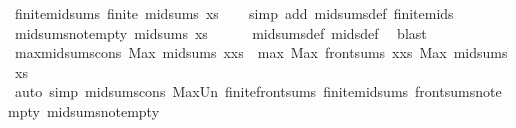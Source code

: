 \begin{isabellebody}
{\isafoldproof}%
%
\isadelimproof
\isanewline
%
\endisadelimproof
\isanewline
{}\isamarkupfalse%
\ finite{\isacharunderscore}{\kern0pt}mid{\isacharunderscore}{\kern0pt}sums{\isacharcolon}{\kern0pt}\ {\isachardoublequoteopen}finite\ {\isacharparenleft}{\kern0pt}mid{\isacharunderscore}{\kern0pt}sums\ xs{\isacharparenright}{\kern0pt}{\isachardoublequoteclose}\isanewline
%
\isadelimproof
\ \ %
\endisadelimproof
%
\isatagproof
{}\isamarkupfalse%
\ {\isacharparenleft}{\kern0pt}simp\ add{\isacharcolon}{\kern0pt}\ mid{\isacharunderscore}{\kern0pt}sums{\isacharunderscore}{\kern0pt}def\ finite{\isacharunderscore}{\kern0pt}mids{\isacharparenright}{\kern0pt}%
\endisatagproof
{\isafoldproof}%
%
\isadelimproof
\isanewline
%
\endisadelimproof
\isanewline
{}\isamarkupfalse%
\ mid{\isacharunderscore}{\kern0pt}sums{\isacharunderscore}{\kern0pt}not{\isacharunderscore}{\kern0pt}empty{\isacharcolon}{\kern0pt}\ {\isachardoublequoteopen}mid{\isacharunderscore}{\kern0pt}sums\ xs\ {\isasymnoteq}\ {\isacharbraceleft}{\kern0pt}{\isacharbraceright}{\kern0pt}{\isachardoublequoteclose}\isanewline
%
\isadelimproof
\ \ %
\endisadelimproof
%
\isatagproof
{}\isamarkupfalse%
\ mid{\isacharunderscore}{\kern0pt}sums{\isacharunderscore}{\kern0pt}def\ mids{\isacharunderscore}{\kern0pt}def\ \isamarkupfalse%
\ blast%
\endisatagproof
{\isafoldproof}%
%
\isadelimproof
\isanewline
%
\endisadelimproof
\isanewline
{}\isamarkupfalse%
\ max{\isacharunderscore}{\kern0pt}mid{\isacharunderscore}{\kern0pt}sums{\isacharunderscore}{\kern0pt}cons{\isacharcolon}{\kern0pt}\ {\isachardoublequoteopen}Max\ {\isacharparenleft}{\kern0pt}mid{\isacharunderscore}{\kern0pt}sums\ {\isacharparenleft}{\kern0pt}x{\isacharhash}{\kern0pt}xs{\isacharparenright}{\kern0pt}{\isacharparenright}{\kern0pt}\ {\isacharequal}{\kern0pt}\ max\ {\isacharparenleft}{\kern0pt}Max\ {\isacharparenleft}{\kern0pt}front{\isacharunderscore}{\kern0pt}sums\ {\isacharparenleft}{\kern0pt}x{\isacharhash}{\kern0pt}xs{\isacharparenright}{\kern0pt}{\isacharparenright}{\kern0pt}{\isacharparenright}{\kern0pt}\ {\isacharparenleft}{\kern0pt}Max\ {\isacharparenleft}{\kern0pt}mid{\isacharunderscore}{\kern0pt}sums\ xs{\isacharparenright}{\kern0pt}{\isacharparenright}{\kern0pt}{\isachardoublequoteclose}\isanewline
%
\isadelimproof
\ \ %
\endisadelimproof
%
\isatagproof
{}\isamarkupfalse%
\ {\isacharparenleft}{\kern0pt}auto\ simp{\isacharcolon}{\kern0pt}\ mid{\isacharunderscore}{\kern0pt}sums{\isacharunderscore}{\kern0pt}cons\ Max{\isacharunderscore}{\kern0pt}Un\ finite{\isacharunderscore}{\kern0pt}front{\isacharunderscore}{\kern0pt}sums\ finite{\isacharunderscore}{\kern0pt}mid{\isacharunderscore}{\kern0pt}sums\ front{\isacharunderscore}{\kern0pt}sums{\isacharunderscore}{\kern0pt}not{\isacharunderscore}{\kern0pt}empty\ mid{\isacharunderscore}{\kern0pt}sums{\isacharunderscore}{\kern0pt}not{\isacharunderscore}{\kern0pt}empty{\isacharparenright}{\kern0pt}%

\end{isabellebody}
